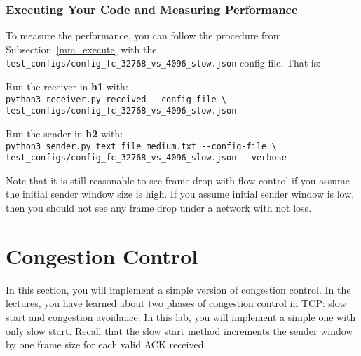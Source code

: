 \documentclass[11pt]{article}
\begin{document}


\subsubsection{Executing Your Code and Measuring Performance}
\label{fc_execute}
To measure the performance, you can follow the procedure from Subsection~\ref{mm_execute} with the \texttt{test\_configs/config\_fc\_32768\_vs\_4096\_slow.json} config file. That is:

\noindent Run the receiver in \textbf{h1} with:\\
\texttt{python3 receiver.py received -{}-config-file \textbackslash\\
test\_configs/config\_fc\_32768\_vs\_4096\_slow.json}

\noindent Run the sender in \textbf{h2} with:\\
\texttt{python3 sender.py text\_file\_medium.txt -{}-config-file \textbackslash\\
test\_configs/config\_fc\_32768\_vs\_4096\_slow.json -{}-verbose}


Note that it is still reasonable to see frame drop with flow control if you assume the initial sender window size is high. If you assume initial sender window is low, then you should not see any frame drop under a network with not loss.

\section{Congestion Control}
\label{sec:congestion_control}
In this section, you will implement a simple version of congestion control. In the lectures, you have learned about two phases of congestion control in TCP: slow start and congestion avoidance. In this lab, you will implement a simple one with only slow start. Recall that the slow start method increments the sender window by one frame size for each valid ACK received.
\end{document}
